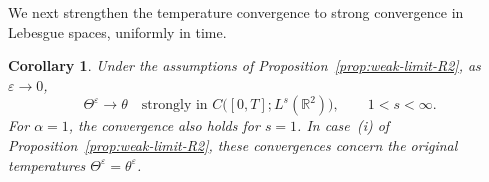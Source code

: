 \documentclass[reqno,11pt,a4paper]{amsart}
\newtheorem{corollary}[theorem]{Corollary}
\begin{document}
We next strengthen the temperature convergence to strong
convergence in Lebesgue spaces, uniformly in time.
\begin{corollary}\label{cor:strong-limit-R2}
Under the assumptions of
Proposition~\ref{prop:weak-limit-R2},
as $\varepsilon\rightarrow 0$,
\begin{equation}\label{eq:Thet-eps-the-CLs-conv}
  \Theta^\varepsilon\longrightarrow\theta
  \quad\text{strongly in }
  C\bigl([0,T];L^s(\mathbb R^2)\bigr),
  \qquad 1<s<\infty.
\end{equation}
For $\alpha=1$, the convergence also holds for $s=1$.
In case~(i) of Proposition~\ref{prop:weak-limit-R2},
these convergences concern the original temperatures
$\Theta^\varepsilon=\theta^\varepsilon$.
\end{corollary}
\end{document}
